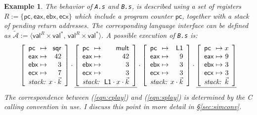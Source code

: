 \documentclass[11pt,oneside]{book}
\newtheorem{example}[theorem]{Example}
\theoremstyle{definition}
\newcommand{\kw}[1]{\ensuremath{ \mathsf{#1} }}
\newcommand{\figsize}{}
\begin{document}
\begin{example}
The behavior of \texttt{A.s} and \texttt{B.s},
is described using a set of registers
$R := \{ \kw{pc}, \kw{eax}, \kw{ebx}, \kw{ecx} \}$
which include a program counter $\kw{pc}$,
together with a stack of pending return addresses.
The corresponding language interface can be defined as
$\tilde{\mathcal{A}} :=
 \langle \kw{val}^R \times \kw{val}^*, \,
         \kw{val}^R \times \kw{val}^* \rangle$.
A possible execution of \texttt{B.s}
is: %
\begin{equation} \label{eqn:splay}
{
  \figsize
  \left[
    \begin{array}{l@{{} \mapsto {}}r}
      \kw{pc}  & \kw{sqr} \\
      \kw{eax} & 42 \\
      \kw{ebx} & 3 \\
      \kw{ecx} & 7 \\
      \multicolumn{2}{c}{\textit{stack: } \hfill x \cdot \vec{k}}
    \end{array}
  \right] \cdot
  \underline{
    \left[
      \begin{array}{l@{{} \mapsto {}}r}
        \kw{pc}  & \kw{mult} \\
        \kw{eax} & 42 \\
        \kw{ebx} & 3 \\
        \kw{ecx} & 3 \\
        \multicolumn{2}{c}{\textit{stack: } \: \kw{L1} \cdot x \cdot \vec{k}}
      \end{array}
    \right]} \cdot
  \left[
    \begin{array}{l@{{} \mapsto {}}r}
      \kw{pc}  & \kw{L1} \\
      \kw{eax} & 9 \\
      \kw{ebx} & 3 \\
      \kw{ecx} & 3 \\
      \multicolumn{2}{c}{\textit{stack: } \hfill x \cdot \vec{k}}
    \end{array}
  \right] \cdot
  \underline{
    \left[
      \begin{array}{l@{{} \mapsto {}}r}
        \kw{pc}  & x \\
        \kw{eax} & 9 \\
        \kw{ebx} & 3 \\
        \kw{ecx} & 3 \\
        \multicolumn{2}{c}{\textit{stack: } \hfill \vec{k}}
      \end{array}
    \right]}
}
\end{equation}
The correspondence between (\ref{eqn:cplay}) and (\ref{eqn:splay})
is determined by the C calling convention in use.
I discuss this point in more detail in \S\ref{sec:simconv}.
\end{example}
\end{document}
